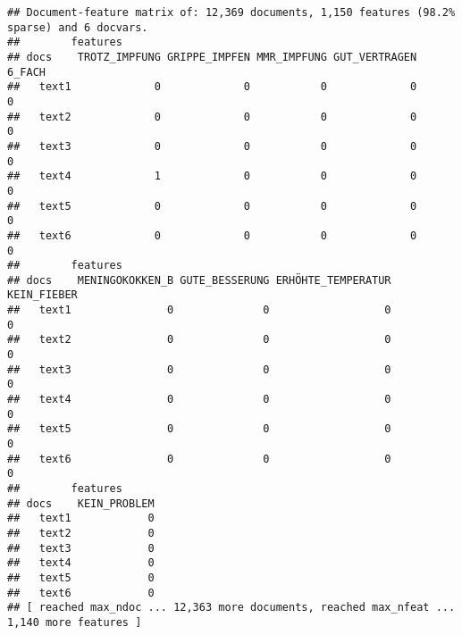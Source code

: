\documentclass[
]{book}
\newenvironment{Shaded}{\begin{snugshade}}{\end{snugshade}}
\newcommand{\CommentTok}[1]{\textcolor[rgb]{0.56,0.35,0.01}{\textit{#1}}}
\newcommand{\DecValTok}[1]{\textcolor[rgb]{0.00,0.00,0.81}{#1}}
\newcommand{\KeywordTok}[1]{\textcolor[rgb]{0.13,0.29,0.53}{\textbf{#1}}}
\newcommand{\NormalTok}[1]{#1}
\newcommand{\OperatorTok}[1]{\textcolor[rgb]{0.81,0.36,0.00}{\textbf{#1}}}
\newcommand{\StringTok}[1]{\textcolor[rgb]{0.31,0.60,0.02}{#1}}
\begin{document}
\begin{verbatim}
## Document-feature matrix of: 12,369 documents, 1,150 features (98.2% sparse) and 6 docvars.
##        features
## docs    TROTZ_IMPFUNG GRIPPE_IMPFEN MMR_IMPFUNG GUT_VERTRAGEN 6_FACH
##   text1             0             0           0             0      0
##   text2             0             0           0             0      0
##   text3             0             0           0             0      0
##   text4             1             0           0             0      0
##   text5             0             0           0             0      0
##   text6             0             0           0             0      0
##        features
## docs    MENINGOKOKKEN_B GUTE_BESSERUNG ERHÖHTE_TEMPERATUR KEIN_FIEBER
##   text1               0              0                  0           0
##   text2               0              0                  0           0
##   text3               0              0                  0           0
##   text4               0              0                  0           0
##   text5               0              0                  0           0
##   text6               0              0                  0           0
##        features
## docs    KEIN_PROBLEM
##   text1            0
##   text2            0
##   text3            0
##   text4            0
##   text5            0
##   text6            0
## [ reached max_ndoc ... 12,363 more documents, reached max_nfeat ... 1,140 more features ]
\end{verbatim}

\begin{Shaded}
\end{Shaded}
\end{document}

